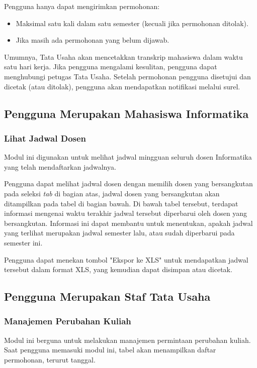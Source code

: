 Pengguna hanya dapat mengirimkan permohonan:
\begin{itemize}
	\item Maksimal satu kali dalam satu semester (kecuali jika permohonan ditolak).
	\item Jika masih ada permohonan yang belum dijawab.
\end{itemize}

Umumnya, Tata Usaha akan mencetakkan transkrip mahasiswa dalam waktu satu hari kerja. Jika pengguna mengalami kesulitan, pengguna dapat menghubungi petugas Tata Usaha. Setelah permohonan pengguna disetujui dan dicetak (atau ditolak), pengguna akan mendapatkan notifikasi melalui surel.

\subsection{Pengguna Merupakan Mahasiswa Informatika}
\label{sec:bluetape_mahasiswa_informatika}

\subsubsection{Lihat Jadwal Dosen}
\label{sec:bluetape_lihat_jadwal_dosen}

Modul ini digunakan untuk melihat jadwal mingguan seluruh dosen Informatika yang telah mendaftarkan jadwalnya.

Pengguna dapat melihat jadwal dosen dengan memilih dosen yang bersangkutan pada seleksi \textit{tab} di bagian atas, jadwal dosen yang bersangkutan akan ditampilkan pada tabel di bagian bawah. Di bawah tabel tersebut, terdapat informasi mengenai waktu terakhir jadwal tersebut diperbarui oleh dosen yang bersangkutan. Informasi ini dapat membantu untuk menentukan, apakah jadwal yang terlihat merupakan jadwal semester lalu, atau sudah diperbarui pada semester ini.

Pengguna dapat menekan tombol "Ekspor ke XLS" untuk mendapatkan jadwal tersebut dalam format XLS, yang kemudian dapat disimpan atau dicetak.

\subsection{Pengguna Merupakan Staf Tata Usaha}
\label{sec:bluetape_staf_tata_usaha}

\subsubsection{Manajemen Perubahan Kuliah}
\label{sec:bluetape_manajemen_perubahan_kuliah}
Modul ini berguna untuk melakukan manajemen permintaan perubahan kuliah. Saat pengguna memasuki modul ini, tabel akan menampilkan daftar permohonan, terurut tanggal.

